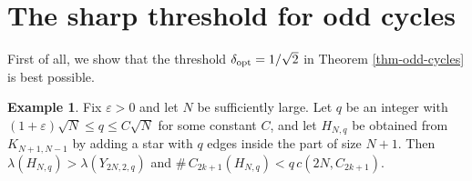 \documentclass[11pt,a4paper]{article}
\theoremstyle{definition}
\newtheorem{example}[theorem]{Example}
\theoremstyle{plain}
\renewcommand{\le}{\leqslant}
\begin{document}
\section{The sharp threshold for odd cycles}

\label{sec:odd}

First of all, we show that the threshold $\delta_{\rm opt} =1/\sqrt{2}$ in Theorem \ref{thm-odd-cycles} is best possible. 

\begin{example}\label{exam-odd-cycle}
Fix $\varepsilon>0$ and let $N$ be sufficiently
large. Let $q$ be an integer with
$(1+\varepsilon)\sqrt N\le q\le C \sqrt N$ for some constant $C$, and let
$H_{N,q}$ be obtained from $K_{N+1,N-1}$ by adding a
star with $q$ edges inside the part of size $N+1$.
Then $\lambda(H_{N,q})>\lambda(Y_{2N,2,q})$ and
$\texttt{\#}\,C_{2k+1}(H_{N,q})<q\,c(2N,C_{2k+1})$.
\end{example} 
\end{document}
